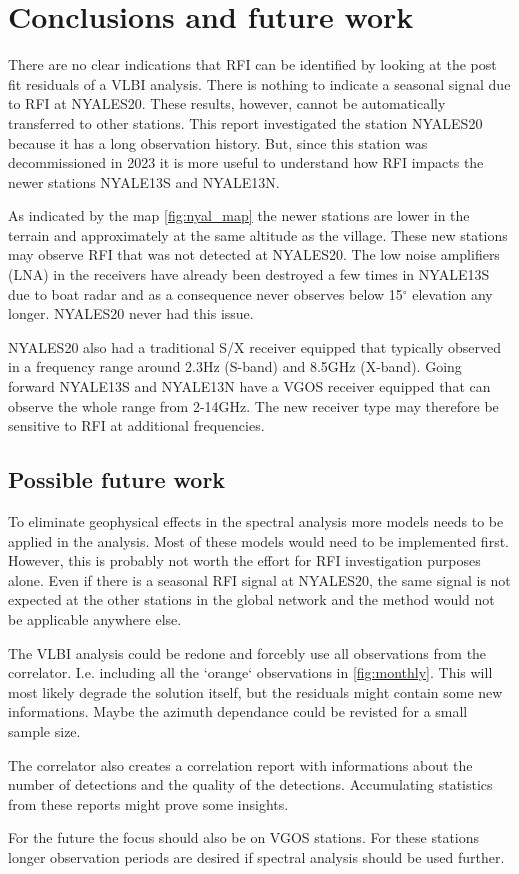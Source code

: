 \documentclass[twoside=semi,fontsize=12pt,paper=a4,titlepage=on]{kv_article}
\begin{document}
\section{Conclusions and future work}
There are no clear indications that RFI can be identified by looking at the post fit residuals of a VLBI analysis. There is nothing to indicate a seasonal signal due to RFI at NYALES20. These results, however, cannot be automatically transferred to other stations. This report investigated the station NYALES20 because it has a long observation history. But, since this station was decommissioned in 2023 it is more useful to understand how RFI impacts the newer stations NYALE13S and NYALE13N.

As indicated by the map \ref{fig:nyal_map} the newer stations are lower in the terrain and approximately at the same altitude as the village. These new stations may observe RFI that was not detected at NYALES20. The low noise amplifiers (LNA) in the receivers have already been destroyed a few times in NYALE13S due to boat radar \cite{perez2019} and as a consequence never observes below 15$^\circ$ elevation any longer. NYALES20 never had this issue.

NYALES20 also had a traditional S/X receiver equipped that typically observed in a frequency range around 2.3Hz (S-band) and 8.5GHz (X-band). Going forward NYALE13S and NYALE13N have a VGOS receiver equipped that can observe the whole range from 2-14GHz. The new receiver type may therefore be sensitive to RFI at additional frequencies. 

\subsection{Possible future work}
To eliminate geophysical effects in the spectral analysis more models needs to be applied in the analysis. Most of these models would need to be implemented first. However, this is probably not worth the effort for RFI investigation purposes alone. Even if there is a seasonal RFI signal at NYALES20, the same signal is not expected at the other stations in the global network and the method would not be applicable anywhere else.

The VLBI analysis could be redone and forcebly use all observations from the correlator. I.e. including all the `orange` observations in \ref{fig:monthly}. This will most likely degrade the solution itself, but the residuals might contain some new informations. Maybe the azimuth dependance could be revisted for a small sample size.

The correlator also creates a correlation report with informations about the number of detections and the quality of the detections. Accumulating statistics from these reports might prove some insights. 

For the future the focus should also be on VGOS stations. For these stations longer observation periods are desired if  spectral analysis should be used further. 

\newpage


\end{document}
